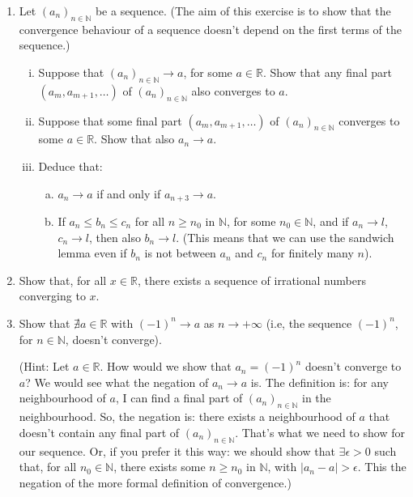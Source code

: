 \documentclass[11pt]{amsart}
\newcommand\R{{\mathbb{R}}}
\newcommand\N{{\mathbb N}}
\theoremstyle{plain}
\theoremstyle{definition}
\numberwithin{equation}{section}
\begin{document}
\begin{enumerate}
\item Let $(a_n)_{n\in\mathbb{N}}$ be a sequence. (The aim of this exercise is to show that the convergence behaviour of a sequence doesn't depend on the first terms of the sequence.)
\begin{enumerate}[(i)]
\item Suppose that $(a_n)_{n\in\N}\rightarrow a$, for some $a\in\R$. Show that any final part $(a_m,a_{m+1},\ldots)$ of $(a_n)_{n\in\N}$ also converges to $a$.
\item Suppose that some final part $(a_m,a_{m+1},\ldots)$ of $(a_n)_{n\in\N}$ converges to some $a\in\R$. Show that also $a_n\rightarrow a$.
\item Deduce that:
\begin{enumerate}[(a)]
\item $a_n\rightarrow a$ if and only if $a_{n+3}\rightarrow a$.
\item If $a_n\leq b_n\leq c_n$ for all $n\geq n_0$ in $\N$, for some $n_0\in\N$, and if $a_n\rightarrow l$, $c_n\rightarrow l$, then also $b_n\rightarrow l$. (This means that we can use the sandwich lemma even if $b_n$ is not between $a_n$ and $c_n$ for finitely many $n$).
\end{enumerate}
\end{enumerate}
\vspace{0.4in}

\item Show that, for all $x \in \R$, there exists a sequence of irrational numbers converging to $x$.
\vspace{0.4in}

\item Show that $\nexists a\in\R$ with $(-1)^n\rightarrow a$ as $n\rightarrow +\infty$ (i.e, the sequence $(-1)^n$, for $n\in\N$, doesn't converge).

(Hint: Let $a\in\R$. How would we show that $a_n=(-1)^n$ doesn't converge to $a$? We would see what the negation of $a_n\rightarrow a$ is. The definition is: for any neighbourhood of $a$, I can find a final part of $(a_n)_{n\in\N}$ in the neighbourhood. So, the negation is: there exists a neighbourhood of $a$ that doesn't contain any final part of $(a_n)_{n\in\N}$. That's what we need to show for our sequence. Or, if you prefer it this way: we should show that $\exists \epsilon>0$ such that, for all $n_0\in\N$, there exists some $n\geq n_0$ in $\N$, with $|a_n-a|>\epsilon$. This the negation of the more formal definition of convergence.)
\vspace{0.4in}


\end{enumerate}
\end{document}
